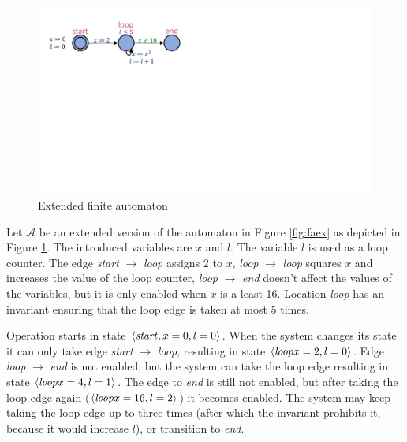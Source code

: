 \begin{figure}
	\centering
	\begin{minipage}{0.6\textwidth}
		\includegraphics[width=\textwidth]{include/figures/loop_example_discrete}%
		\caption{Extended finite automaton}
		\label{fig:efaex}
	\end{minipage}
\end{figure}

\begin{example}
	Let $\mathcal{A}$ be an extended version of the automaton in Figure \ref{fig:faex} as depicted in Figure \ref{fig:efaex}. The introduced variables are $x$ and $l$. The variable $l$ is used as a loop counter. The edge \emph{start} $\to$ \emph{loop} assigns 2 to $x$, \emph{loop} $\to$ \emph{loop} squares $x$ and increases the value of the loop counter, \emph{loop} $\to$ \emph{end} doesn't affect the values of the variables, but it is only enabled when $x$ is a least 16. Location \emph{loop} has an invariant ensuring that the loop edge is taken at most 5 times.
	
	Operation starts in state $\langle \text{\emph{start}}, x=0, l=0\rangle$. When the system changes its state it can only take edge \emph{start} $\to$ \emph{loop}, resulting in state $\langle \text{\emph{loop}} x=2, l=0 \rangle$. Edge  \emph{loop} $\to$ \emph{end} is not enabled, but the system can take the loop edge resulting in state $\langle \text{\emph{loop}} x=4, l=1\rangle$. The edge to \emph{end} is still not enabled, but after taking the loop edge again ($\langle \text{\emph{loop}} x=16, l=2\rangle$) it becomes enabled. The system may keep taking the loop edge up to three times (after which the invariant prohibits it, because it would increase $l$), or transition to \emph{end}.
\end{example}

